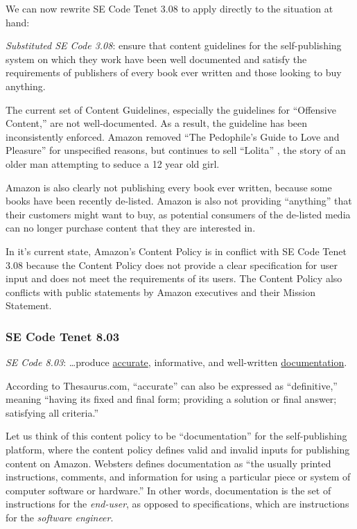 \documentclass[11pt]{article}
\begin{document}
\begin{multicols}{2}
We can now rewrite SE Code Tenet 3.08 to apply directly to the situation at hand:

\emph{Substituted SE Code 3.08}: ensure that content guidelines for the self-publishing system on which they work have been well documented and satisfy the requirements of publishers of every book ever written and those looking to buy anything.

The current set of Content Guidelines, especially the guidelines for ``Offensive Content,'' are not well-documented.  As a result, the guideline has been inconsistently enforced.  Amazon removed ``The Pedophile's Guide to Love and Pleasure'' for unspecified reasons, but continues to sell ``Lolita'' \cite{AmazonLolitaDTPListing}, the story of an older man attempting to seduce a 12 year old girl. 

Amazon is also clearly not publishing every book ever written, because some books have been recently de-listed.  Amazon is also not providing ``anything'' that their customers might want to buy, as potential consumers of the de-listed media can no longer purchase content that they are interested in.

In it's current state, Amazon's Content Policy is in conflict with SE Code Tenet 3.08 because the Content Policy does not provide a clear specification for user input and does not meet the requirements of its users.  The Content Policy also conflicts with public statements by Amazon executives and their Mission Statement.

\subsubsection{SE Code Tenet 8.03}

\emph{SE Code 8.03}: \ldots produce \underline{accurate}, informative, and well-written \underline{documentation}. 

According to Thesaurus.com, ``accurate'' can also be expressed as ``definitive,'' meaning ``having its fixed and final form; providing a solution or final answer; satisfying all criteria.'' \cite{Thesaurus, Dictionary}  

Let us think of this content policy to be ``documentation'' for the self-publishing platform, where the content policy defines valid and invalid inputs for publishing content on Amazon.  Websters defines documentation as ``the usually printed instructions, comments, and information for using a particular piece or system of computer software or hardware.'' \cite{WebsterOnlineDict} In other words, documentation is the set of instructions for the \emph{end-user}, as opposed to specifications, which are instructions for the \emph{software engineer}. 


\end{multicols}
\end{document}
